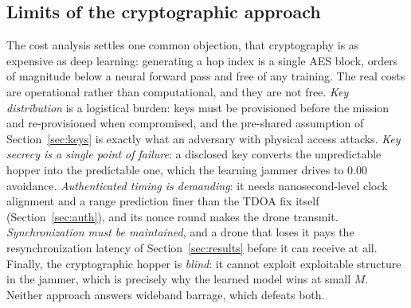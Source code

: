 \documentclass[journal]{IEEEtran}
\begin{document}
\subsection{Limits of the cryptographic approach}
The cost analysis settles one common objection, that cryptography is as
expensive as deep learning: generating a hop index is a single AES block, orders
of magnitude below a neural forward pass and free of any training. The real
costs are operational rather than computational, and they are not free.
\emph{Key distribution} is a logistical burden: keys must be provisioned before
the mission and re-provisioned when compromised, and the pre-shared assumption
of Section~\ref{sec:keys} is exactly what an adversary with physical access
attacks. \emph{Key secrecy is a single point of failure}: a disclosed key
converts the unpredictable hopper into the predictable one, which the learning
jammer drives to $0.00$ avoidance. \emph{Authenticated timing is demanding}: it
needs nanosecond-level clock alignment and a range prediction finer than the
TDOA fix itself (Section~\ref{sec:auth}), and its nonce round makes the drone
transmit. \emph{Synchronization must be maintained}, and
a drone that loses it pays the resynchronization latency of
Section~\ref{sec:results} before it can receive at all. Finally, the
cryptographic hopper is \emph{blind}: it cannot exploit exploitable structure in
the jammer, which is precisely why the learned model wins at small $M$. Neither
approach answers wideband barrage, which defeats both.
\end{document}
